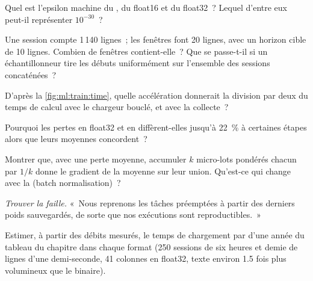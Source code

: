 \begin{exercise}[$\star$]\label{exo:ml:training-infrastructure:1}
Quel est l'epsilon machine du , du float16 et du float32~? Lequel d'entre eux peut-il représenter $10^{-30}$~?
\end{exercise}

\begin{exercise}[$\star$]\label{exo:ml:training-infrastructure:2}
Une session compte 1\,140 lignes~; les fenêtres font 20 lignes, avec un horizon cible de 10 lignes. Combien de fenêtres contient-elle~? Que se passe-t-il si
un échantillonneur tire les débuts uniformément sur l'ensemble des sessions concaténées~?
\end{exercise}

\begin{exercise}[$\star$]\label{exo:ml:training-infrastructure:3}
D'après la \cref{fig:ml:train:time}, quelle accélération donnerait la division par deux du temps de calcul avec le chargeur bouclé, et avec la collecte~?
\end{exercise}

\begin{exercise}[$\star\star$]\label{exo:ml:training-infrastructure:4}
Pourquoi les pertes en float32 et en  diffèrent-elles jusqu'à 22~\% à certaines étapes alors que leurs moyennes concordent~?
\end{exercise}

\begin{exercise}[$\star\star$]\label{exo:ml:training-infrastructure:5}
Montrer que, avec une perte moyenne, accumuler $k$ micro-lots pondérés chacun par $1/k$ donne le gradient de la moyenne sur leur union.
Qu'est-ce qui change avec la  (batch normalisation)~?
\end{exercise}

\begin{exercise}[$\star\star$]\label{exo:ml:training-infrastructure:6}
\emph{Trouver la faille.} «~Nous reprenons les tâches préemptées à partir des derniers poids sauvegardés, de sorte que nos exécutions sont reproductibles.~»
\end{exercise}

\begin{exercise}[$\star\star\star$]\label{exo:ml:training-infrastructure:7}
Estimer, à partir des débits mesurés, le temps de chargement par  d'une année du tableau du chapitre dans chaque format (250
sessions de six heures et demie de lignes d'une demi-seconde, 41 colonnes en float32, texte environ 1.5 fois plus volumineux que le binaire).
\end{exercise}

